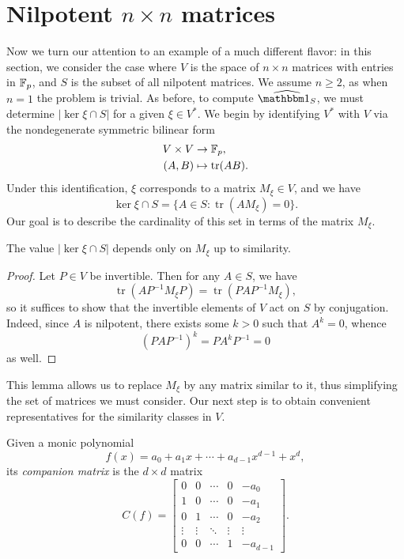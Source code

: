 \newcommand{\Mat}{\operatorname{Mat}}
\newcommand{\tr}{\operatorname{tr}}
\newcommand{\fact}{\operatorname{fact}}

\section{Nilpotent $n\times n$ matrices}\label{sec:part3}

Now we turn our attention to an example of a much different flavor: in this section, we consider the case where $V$ is the space of $n\times n$ matrices with entries in $\mathbb{F}_p$, and $S$ is the subset of all nilpotent matrices. We assume $n\ge 2$, as when $n=1$ the problem is trivial. As before, to compute $\widehat{\IND_S}$, we must determine $|\ker\xi\cap S|$ for a given $\xi\in V^*$. We begin by identifying $V^*$ with $V$ via the nondegenerate symmetric bilinear form
\begin{align*}
V\times V&\to\F_p,\\
(A,B)&\mapsto\tr(AB).
\end{align*}
Under this identification, $\xi$ corresponds to a matrix $M_\xi\in V$, and we have
\begin{equation}
\label{eqn:kerlambda}
\ker\xi\cap S=\{A\in S:\tr(AM_\xi)=0\}.
\end{equation}
Our goal is to describe the cardinality of this set in terms of the matrix $M_\xi$.
\begin{lem}
\label{lem:sim}
The value $|\ker\xi\cap S|$ depends only on $M_\xi$ up to similarity.
\end{lem}
\begin{proof}
Let $P\in V$ be invertible. Then for any $A\in S$, we have
\begin{equation*}
\tr(AP^{-1}M_\xi P)=\tr(PAP^{-1}M_\xi),
\end{equation*}
so it suffices to show that the invertible elements of $V$ act on $S$ by conjugation. Indeed, since $A$ is nilpotent, there exists some $k>0$ such that $A^k=0$, whence
\begin{equation*}
(PAP^{-1})^k=PA^kP^{-1}=0
\end{equation*}
as well.
\end{proof}
This lemma allows us to replace $M_\xi$ by any matrix similar to it, thus simplifying the set of matrices we must consider. Our next step is to obtain convenient representatives for the similarity classes in $V$.
\begin{notation}
Given a monic polynomial
\begin{equation*}
f(x)=a_0+a_1x+\cdots+a_{d-1}x^{d-1}+x^d,
\end{equation*}
its \emph{companion matrix} is the $d\times d$ matrix
\begin{equation*}
C(f)=\begin{bmatrix}
0&0&\cdots&0&-a_0\\
1&0&\cdots&0&-a_1\\
0&1&\cdots&0&-a_2\\
\vdots&\vdots&\ddots&\vdots&\vdots\\
0&0&\cdots&1&-a_{d-1}
\end{bmatrix}.
\end{equation*}
\end{notation}
